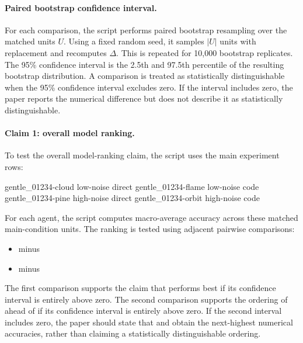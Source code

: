 \documentclass[11pt]{article}
\begin{document}
\paragraph{Paired bootstrap confidence interval.}
For each comparison, the script performs paired bootstrap resampling over the matched units \(U\).
Using a fixed random seed, it samples \(|U|\) units with replacement and recomputes \(\Delta\).
This is repeated for 10,000 bootstrap replicates.
The 95\% confidence interval is the 2.5th and 97.5th percentile of the resulting bootstrap distribution.
A comparison is treated as statistically distinguishable when the 95\% confidence interval excludes zero.
If the interval includes zero, the paper reports the numerical difference but does not describe it as statistically distinguishable.

\paragraph{Claim 1: overall model ranking.}
To test the overall model-ranking claim, the script uses the main experiment rows:
\begin{DocCode}
gentle_01234-cloud   low-noise direct
gentle_01234-flame   low-noise code
gentle_01234-pine    high-noise direct
gentle_01234-orbit   high-noise code
\end{DocCode}
For each agent, the script computes macro-average accuracy across these matched main-condition units.
The ranking is tested using adjacent pairwise comparisons:
\begin{itemize}
  \item {} minus 
  \item {} minus 
\end{itemize}
The first comparison supports the claim that  performs best if its confidence interval is entirely above zero.
The second comparison supports the ordering of  ahead of  if its confidence interval is entirely above zero.
If the second interval includes zero, the paper should state that  and  obtain the next-highest numerical accuracies, rather than claiming a statistically distinguishable ordering.
\end{document}
